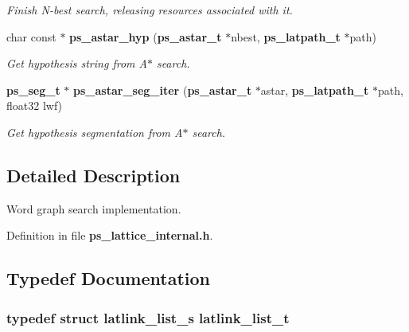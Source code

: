 \begin{DoxyCompactItemize}
\begin{DoxyCompactList}\small\item\em Finish N-\/best search, releasing resources associated with it. \end{DoxyCompactList}\item 
char const $\ast$ {\bf ps\-\_\-astar\-\_\-hyp} ({\bf ps\-\_\-astar\-\_\-t} $\ast$nbest, {\bf ps\-\_\-latpath\-\_\-t} $\ast$path)\label{ps__lattice__internal_8h_ac7372b5c5ec111f6814ce1ba495593e4}

\begin{DoxyCompactList}\small\item\em Get hypothesis string from A$\ast$ search. \end{DoxyCompactList}\item 
{\bf ps\-\_\-seg\-\_\-t} $\ast$ {\bf ps\-\_\-astar\-\_\-seg\-\_\-iter} ({\bf ps\-\_\-astar\-\_\-t} $\ast$astar, {\bf ps\-\_\-latpath\-\_\-t} $\ast$path, float32 lwf)\label{ps__lattice__internal_8h_ac8e3dff7276c03c93377d0cb79fbdbd7}

\begin{DoxyCompactList}\small\item\em Get hypothesis segmentation from A$\ast$ search. \end{DoxyCompactList}\end{DoxyCompactItemize}


\subsection{Detailed Description}
Word graph search implementation. 

Definition in file {\bf ps\-\_\-lattice\-\_\-internal.\-h}.



\subsection{Typedef Documentation}
\subsubsection[{latlink\-\_\-list\-\_\-t}]{\setlength{\rightskip}{0pt plus 5cm}typedef struct {\bf latlink\-\_\-list\-\_\-s}  {\bf latlink\-\_\-list\-\_\-t}}\label{ps__lattice__internal_8h_a32dd9511afc2f024dc63c9c060261e94}


